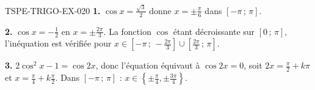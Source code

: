 \begin{corrige}{TSPE-TRIGO-EX-020}
\textbf{1.} $\cos x=\tfrac{\sqrt3}{2}$ donne $x=\pm\tfrac{\pi}{6}$ dans
$[-\pi\,;\,\pi]$.

\textbf{2.} $\cos x=-\tfrac12$ en $x=\pm\tfrac{2\pi}{3}$. La fonction
$\cos$ étant décroissante sur $[0\,;\,\pi]$, l'inéquation est vérifiée pour
$x\in\left[-\pi\,;\,-\tfrac{2\pi}{3}\right]\cup
\left[\tfrac{2\pi}{3}\,;\,\pi\right]$.

\textbf{3.} $2\cos^2x-1=\cos2x$, donc l'équation équivaut à $\cos2x=0$, soit
$2x=\tfrac{\pi}{2}+k\pi$ et $x=\tfrac{\pi}{4}+k\tfrac{\pi}{2}$. Dans
$[-\pi\,;\,\pi]$ : $x\in\left\{\pm\tfrac{\pi}{4},\pm\tfrac{3\pi}{4}\right\}$.
\end{corrige}
